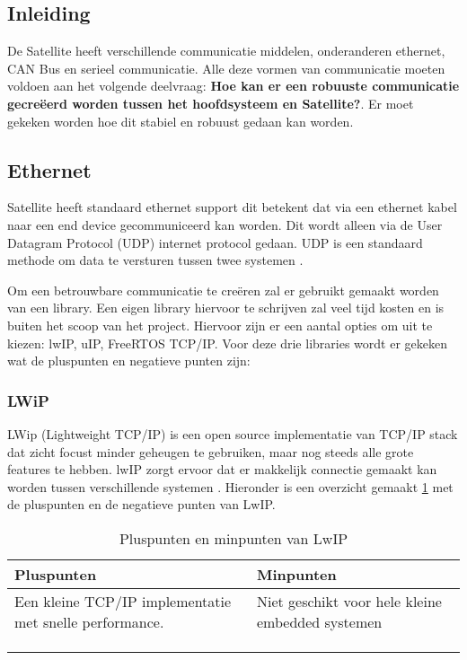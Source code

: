 \subsection{Inleiding}
De Satellite heeft verschillende communicatie middelen, onderanderen ethernet, CAN Bus en serieel communicatie. Alle deze vormen van communicatie moeten voldoen aan het volgende deelvraag: \textbf{Hoe kan er een robuuste communicatie gecreëerd worden tussen het hoofdsysteem en Satellite?}. Er moet gekeken worden hoe dit stabiel en robuust gedaan kan worden.

\subsection{Ethernet}
Satellite heeft standaard ethernet support dit betekent dat via een ethernet kabel naar een end device gecommuniceerd kan worden. Dit wordt alleen via de User Datagram Protocol (UDP) internet protocol gedaan. UDP is een standaard methode om data te versturen tussen twee systemen \autocite{CloudFlareUDP}. \newline

\noindent Om een betrouwbare communicatie te creëren zal er gebruikt gemaakt worden van een library. Een eigen library hiervoor te schrijven zal veel tijd kosten en is buiten het scoop van het project. Hiervoor zijn er een aantal opties om uit te kiezen: lwIP, uIP, FreeRTOS TCP/IP. Voor deze drie libraries wordt er gekeken wat de pluspunten en negatieve punten zijn:

\subsubsection{LWiP}
LWip (Lightweight TCP/IP) is een open source implementatie van TCP/IP stack dat zicht focust minder geheugen te gebruiken, maar nog steeds alle grote features te hebben. lwIP zorgt ervoor dat er makkelijk connectie gemaakt kan worden tussen verschillende systemen \autocite{LWIP}. Hieronder is een overzicht gemaakt \ref{tab:lwipoverzicht} met de pluspunten en de negatieve punten van LwIP.

\begin{table}[h!]
	\caption{Pluspunten en minpunten van LwIP}
	\begin{tabular}{p{8cm}p{8cm}}
	\toprule
	Pluspunten & Minpunten \\ \midrule
	Een kleine TCP/IP implementatie	met snelle performance. \autocite{lwipuip}	&  Niet geschikt voor hele kleine embedded systemen \autocite{lwipuip}         \\
																				&           \\
			   																	&           \\
			   																	&           \\ \bottomrule
	\end{tabular}
	
	\label{tab:lwipoverzicht}
\end{table}

